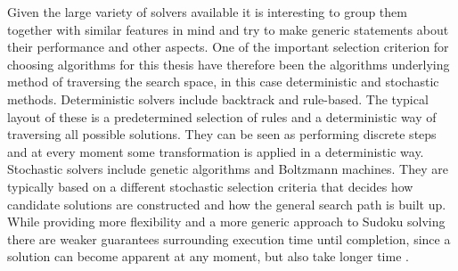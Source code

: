\documentclass[a4paper,11pt]{kth-mag}
\begin{document}
Given the large variety of solvers available it is interesting to group them together with similar features in mind and try to make generic statements about their performance and other aspects.
One of the important selection criterion for choosing algorithms for this thesis have therefore been the algorithms underlying method of traversing the search space, in this case deterministic and stochastic methods.
Deterministic solvers include backtrack and rule-based.
The typical layout of these is a predetermined selection of rules and a deterministic way of traversing all possible solutions.
They can be seen as performing discrete steps and at every moment some transformation is applied in a deterministic way.
Stochastic solvers include genetic algorithms and Boltzmann machines.
They are typically based on a different stochastic selection criteria that decides how candidate solutions are constructed and how the general search path is built up.
While providing more flexibility and a more generic approach to Sudoku solving there are weaker guarantees surrounding execution time until completion, since a solution can become apparent at any moment, but also take longer time \cite{stochastic}.

\FloatBarrier
\end{document}
